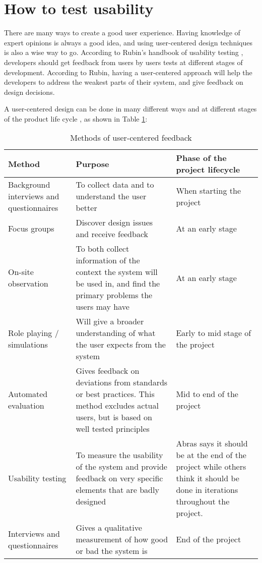 \section{How to test usability}
\label{sec:howtotestusability}
There are many ways to create a good user experience. Having knowledge of expert opinions is always a good idea, and using user-centered design techniques is also a wise way to go. According to Rubin's handbook of usability testing \cite{rubin2008handbook}, developers should get feedback from users by users tests at different stages of development. According to Rubin, having a user-centered approach will help the developers to address the weakest parts of their system, and give feedback on design decisions. 

A user-centered design can be done in many different ways and at different stages of the product life cycle \cite{abrasusercentereddesign}, as shown in Table \ref{table:designduringlifecycle}:

\begin{table}[H]
\begin{tabular}{|p{5cm} | p{5cm} | p{5cm} |}
\hline
\textbf{Method} & \textbf{Purpose} & \textbf{Phase of the project lifecycle} \\ \hline
Background interviews and questionnaires & To collect data and to understand the user better & When starting the project \\ \hline
Focus groups & Discover design issues and receive feedback & At an early stage \\ \hline
On-site observation & To both collect information of the context the system will be used in, and find the primary problems the users may have & At an early stage \\ \hline
Role playing / simulations & Will give a broader understanding of what the user expects from the system & Early to mid stage of the project \\ \hline
Automated evaluation & Gives feedback on deviations from standards or best practices. This method excludes actual users, but is based on well tested principles & Mid to end of the project \\ \hline
Usability testing & To measure the usability of the system and provide feedback on very specific elements that are badly designed & Abras \cite{abrasusercentereddesign} says it should be at the end of the project while others \cite{schneidermanusercentered} think it should be done in iterations throughout the project. \\ \hline
Interviews and questionnaires & Gives a qualitative measurement of how good or bad the system is & End of the project \\ \hline
\end{tabular}
\caption{Methods of user-centered feedback}
\label{table:designduringlifecycle}
\end{table}

